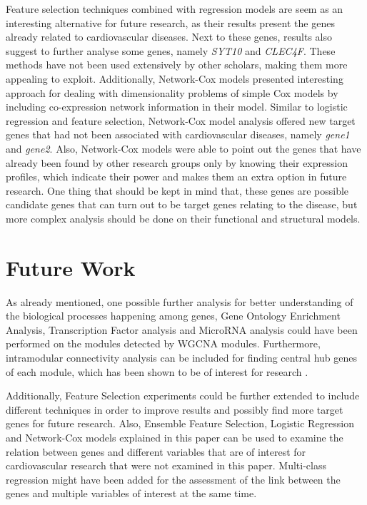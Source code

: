 \documentclass{ba-kecs}
\numberwithin{figure}{section}
\numberwithin{equation}{section}
\begin{document}
Feature selection techniques combined with regression models are seem as an interesting alternative for future research, as their results present the genes already related to cardiovascular diseases. Next to these genes, results also suggest to further analyse some genes, namely \textit{SYT10} and \textit{CLEC4F}. These methods have not been used extensively by other scholars, making them more appealing to exploit. Additionally, Network-Cox models presented interesting approach for dealing with dimensionality problems of simple Cox models by including co-expression network information in their model. Similar to logistic regression and feature selection, Network-Cox model analysis offered new target genes that had not been associated with cardiovascular diseases, namely \textit{gene1} and \textit{gene2}. Also, Network-Cox models were able to point out the genes that have already been found by other research groups only by knowing their expression profiles, which indicate their power and makes them an extra option in future research. One thing that should be kept in mind that, these genes are possible candidate genes that can turn out to be target genes relating to the disease, but more complex analysis should be done on their functional and structural models.

\section{Future Work}

As already mentioned, one possible further analysis for better understanding of the biological processes happening among genes, Gene Ontology Enrichment Analysis, Transcription Factor analysis and MicroRNA analysis could have been performed on the modules detected by WGCNA modules. Furthermore, intramodular connectivity analysis can be included for finding central hub genes of each module, which has been shown to be of interest for research \cite{wgcna2}.

Additionally, Feature Selection experiments could be further extended to include different techniques in order to improve results and possibly find more target genes for future research. Also, Ensemble Feature Selection, Logistic Regression and Network-Cox models explained in this paper can be used to examine the relation between genes and different variables that are of interest for cardiovascular research that were not examined in this paper. Multi-class regression might have been added for the assessment of the link between the genes and multiple variables of interest at the same time.
\end{document}
